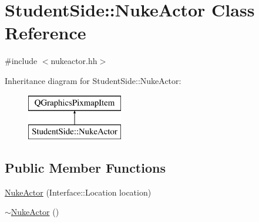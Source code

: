 \hypertarget{class_student_side_1_1_nuke_actor}{\section{Student\-Side\-:\-:Nuke\-Actor Class Reference}
\label{class_student_side_1_1_nuke_actor}
}


{\ttfamily \#include $<$nukeactor.\-hh$>$}

Inheritance diagram for Student\-Side\-:\-:Nuke\-Actor\-:\begin{figure}[H]
\begin{center}
\leavevmode
\includegraphics[height=2.000000cm]{class_student_side_1_1_nuke_actor}
\end{center}
\end{figure}
\subsection*{Public Member Functions}
\begin{DoxyCompactItemize}
\item 
\hyperlink{class_student_side_1_1_nuke_actor_abc65d6502333d97c4cd1beb37bdaa163}{Nuke\-Actor} (Interface\-::\-Location location)
\item 
\hyperlink{class_student_side_1_1_nuke_actor_a1198514f0e17e36e243b344331c543ac}{$\sim$\-Nuke\-Actor} ()
\end{DoxyCompactItemize}


